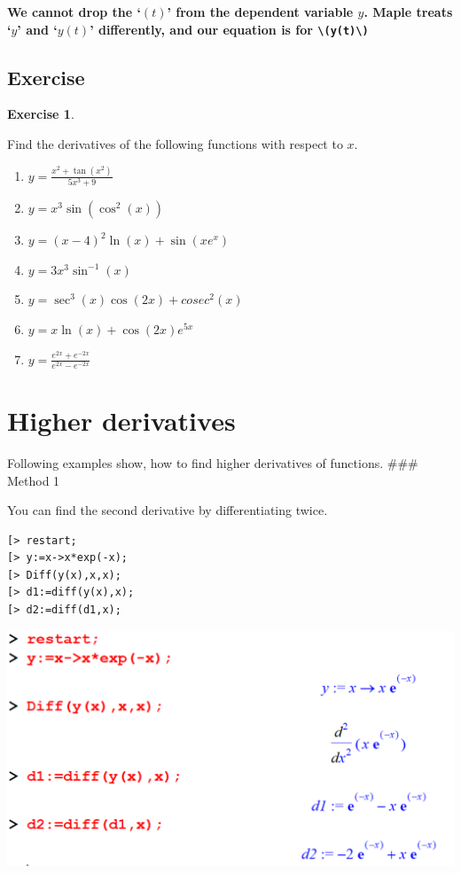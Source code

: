 \documentclass[
]{book}
\providecommand{\tightlist}{%
  \setlength{\itemsep}{0pt}\setlength{\parskip}{0pt}}
\theoremstyle{definition}
\theoremstyle{definition}
\theoremstyle{definition}
\newtheorem{exercise}{Exercise}[chapter]
\theoremstyle{definition}
\theoremstyle{remark}
\begin{document}
\textbf{We cannot drop the `\((t)\)' from the dependent variable \(y\). Maple treats `\(y\)' and `\(y(t)\)' differently, and our equation is for \texttt{\textbackslash{}(y(t)\textbackslash{})}}

\subsection{Exercise}\label{exercise-5}

\begin{exercise}
\protect\hypertarget{exr:unnamed-chunk-27}{}\label{exr:unnamed-chunk-27}

Find the derivatives of the following functions with respect to \(x\).

\begin{enumerate}
\def\labelenumi{\arabic{enumi}.}
\tightlist
\item
  \(y = \frac{x^2 + \tan(x^2)}{5x^3 + 9}\)
\item
  \(y = x^{3}\sin(\cos^2(x))\)
\item
  \(y = {(x - 4)^2}{\ln(x)} + \sin(xe^x)\)
\item
  \(y = {3x^3}{\sin^{-1}(x)}\)
\item
  \(y = {\sec^3(x)\cos(2x) + cosec^2(x)}\)
\item
  \(y = x\ln(x) + \cos(2x)e^{5x}\)
\item
  \(y = \frac{e^{2x} + e^{-2x}}{e^{2x} - e^{-2x}}\)
\end{enumerate}

\end{exercise}

\section{Higher derivatives}\label{higher-derivatives}

Following examples show, how to find higher derivatives of functions.
\#\#\# Method 1

You can find the second derivative by differentiating twice.

\begin{verbatim}
[> restart;
[> y:=x->x*exp(-x);
[> Diff(y(x),x,x);
[> d1:=diff(y(x),x);
[> d2:=diff(d1,x);
\end{verbatim}

\includegraphics{figures/Diff/Diff 6.2 -1.png}
\end{document}
